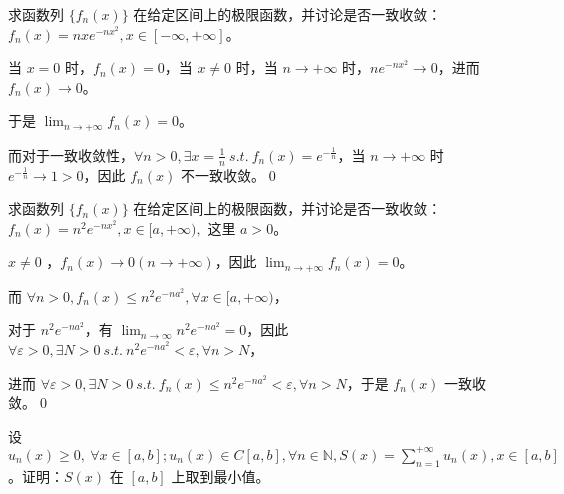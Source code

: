 \begin{ques}
	求函数列 $\displaystyle \{f_{n}( x)\}$ 在给定区间上的极限函数，并讨论是否一致收敛：$\displaystyle f_{n}( x) =nxe^{-nx^{2}} ,x\in [ -\infty ,+\infty ]$。
\end{ques}



当 $\displaystyle x=0$ 时，$\displaystyle f_{n}( x) =0$，当 $\displaystyle x\neq 0$ 时，当 $\displaystyle n\rightarrow +\infty $ 时，$\displaystyle ne^{-nx^{2}}\rightarrow 0$，进而 $\displaystyle f_{n}( x)\rightarrow 0$。

于是 $\displaystyle \lim _{n\rightarrow +\infty } f_{n}( x) =0$。

而对于一致收敛性，$\displaystyle \forall n >0,\exists x=\frac{1}{n} \ s.t.\ f_{n}( x) =e^{-\frac{1}{n}}$，当 $\displaystyle n\rightarrow +\infty $ 时 $\displaystyle e^{-\frac{1}{n}}\rightarrow 1 >0$，因此 $\displaystyle f_{n}( x)$ 不一致收敛。\qed 



\begin{ques}
	求函数列 $\displaystyle \{f_{n}( x)\}$ 在给定区间上的极限函数，并讨论是否一致收敛：$\displaystyle f_{n}( x) =n^{2} e^{-nx^{2}} ,x\in [ a,+\infty ) ,$ 这里 $\displaystyle a >0$。
\end{ques}



$\displaystyle x\neq 0$ ，$\displaystyle f_{n}( x)\rightarrow 0\left( n\rightarrow +\infty \right)$，因此 $\displaystyle \lim _{n\rightarrow +\infty } f_{n}( x) =0$。

而 $\displaystyle \forall n >0,f_{n}( x) \leqslant n^{2} e^{-na^{2}} ,\forall x\in [ a,+\infty )$，

对于 $\displaystyle n^{2} e^{-na^{2}}$，有 $\displaystyle \lim _{n\rightarrow \infty } n^{2} e^{-na^{2}} =0$，因此 $\displaystyle \forall \varepsilon  >0,\exists N >0\ s.t.\ n^{2} e^{-na^{2}} < \varepsilon ,\forall n >N$，

进而 $\displaystyle \forall \varepsilon  >0,\exists N >0\ s.t.\ f_{n}( x) \leqslant n^{2} e^{-na^{2}} < \varepsilon ,\forall n >N$，于是 $\displaystyle f_{n}( x)$ 一致收敛。\qed 



\begin{ques}
	设 $\displaystyle u_{n}( x) \geqslant 0,\ \forall x\in [ a,b] ;u_{n}( x) \in C[ a,b] ,\forall n\in \mathbb{N} ,S( x) =\sum _{n=1}^{+\infty } u_{n}( x) ,x\in [ a,b]$。证明：$\displaystyle S( x)$ 在 $\displaystyle [ a,b]$ 上取到最小值。
\end{ques}


